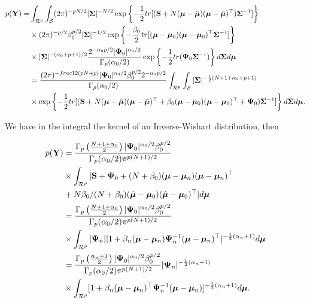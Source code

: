 \begin{enumerate}[leftmargin=*]
\begin{align*}
	p({\bf{Y}})=&\int_{\mathcal{R}^p}\int_{\mathcal{S}}(2\pi)^{-pN/2}|\mathbf{\Sigma}|^{-N/2}\exp\left\{-\frac{1}{2}tr[({\bf{S}}+N(\bm{\mu}-\hat{\bm{\mu}})(\bm{\mu}-\hat{\bm{\mu}})^{\top})\mathbf{\Sigma}^{-1}]\right\}\\
	&\times (2\pi)^{-p/2}\beta_0^{p/2}|\mathbf{\Sigma}|^{-1/2}\exp\left\{-\frac{\beta_0}{2}tr[(\bm{\mu}-\bm{\mu}_0)(\bm{\mu}-\bm{\mu}_0)^{\top}\mathbf{\Sigma}^{-1}]\right\}\\
	&\times |\mathbf{\Sigma}|^{-(\alpha_0+p+1)/2}\frac{2^{-\alpha_0p/2}|\mathbf{\Psi}_0|^{\alpha_0/2}}{\Gamma_p(\alpha_0/2)}\exp\left\{-\frac{1}{2}tr(\mathbf{\Psi}_0\mathbf{\Sigma}^{-1})\right\}d\mathbf{\Sigma} d\bm{\mu}\\
	&=\frac{(2\pi)^{-frac{1}{2}(pN+p)}|\mathbf{\Psi}_0|^{\alpha_0/2}\beta_0^{p/2}2^{-\alpha_0p/2}}{\Gamma_p(\alpha_0/2)}\int_{\mathcal{R}^p}\int_{\mathcal{S}} |\mathbf{\Sigma}|^{-\frac{1}{2}(N+1+\alpha_0+p+1)}\\
	&\times \exp\left\{-\frac{1}{2}tr[({\bf{S}}+N(\bm{\mu}-\hat{\bm{\mu}})(\bm{\mu}-\hat{\bm{\mu}})^{\top}+\beta_0(\bm{\mu}-\bm{\mu}_0)(\bm{\mu}-\bm{\mu}_0)^{\top}+\mathbf{\Psi}_0)\mathbf{\Sigma}^{-1}]\right\}d\mathbf{\Sigma} d\bm{\mu}.
\end{align*}

We have in the integral the kernel of an Inverse-Wishart distribution, then

\begin{align*}
p({\bf{Y}})	&=\frac{\Gamma_p\left(\frac{N+1+\alpha_0}{2}\right)|\mathbf{\Psi}_0|^{\alpha_0/2}\beta_0^{p/2}}{\Gamma_p(\alpha_0/2)\pi^{p(N+1)/2}}\\
	&\times\int_{\mathcal{R}^p} |{\bf{S}}+\mathbf{\Psi}_0+(N+\beta_0)(\bm{\mu}-\bm{\mu}_n)(\bm{\mu}-\bm{\mu}_n)^{\top}\\
	&+N\beta_0/(N+\beta_0)(\hat{\bm{\mu}}-\bm{\mu}_0)(\hat{\bm{\mu}}-\bm{\mu}_0)^{\top}| d\bm{\mu}\\
	&=\frac{\Gamma_p\left(\frac{N+1+\alpha_0}{2}\right)|\mathbf{\Psi}_0|^{\alpha_0/2}\beta_0^{p/2}}{\Gamma_p(\alpha_0/2)\pi^{p(N+1)/2}}\\
	&\times\int_{\mathcal{R}^p} |\mathbf{\Psi}_n||1+\beta_n(\bm{\mu}-\bm{\mu}_n)\mathbf{\Psi}_n^{-1}(\bm{\mu}-\bm{\mu}_n)^{\top}|^{-\frac{1}{2}(\alpha_n+1)} d\bm{\mu}\\
	&=\frac{\Gamma_p\left(\frac{\alpha_n+1}{2}\right)|\mathbf{\Psi}_0|^{\alpha_0/2}\beta_0^{p/2}}{\Gamma_p(\alpha_0/2)\pi^{p(N+1)/2}}|\mathbf{\Psi}_n|^{-\frac{1}{2}(\alpha_n+1)}\\
	&\times\int_{\mathcal{R}^p} [1+\beta_n(\bm{\mu}-\bm{\mu}_n)^{\top}\mathbf{\Psi}_n^{-1}(\bm{\mu}-\bm{\mu}_n)]^{-\frac{1}{2}(\alpha_n+1)} d\bm{\mu}.
\end{align*} 


\end{enumerate}
